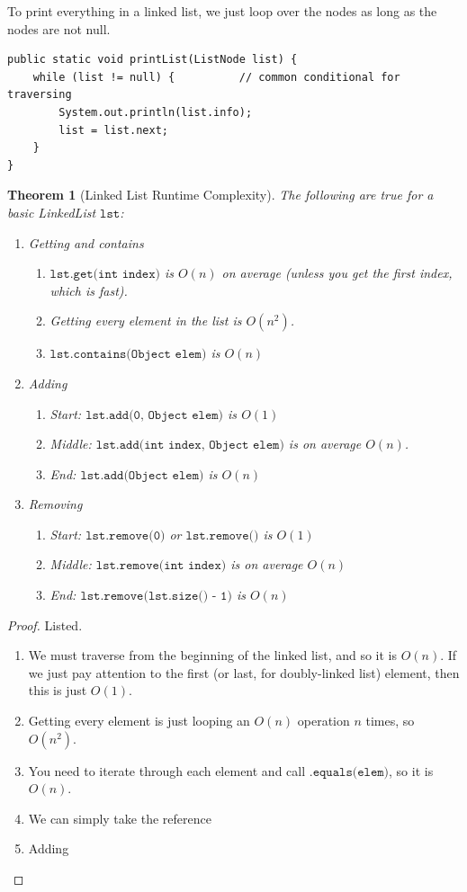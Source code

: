 \documentclass{article}
\newtheorem{theorem}{Theorem}[section]
\theoremstyle{definition}
\theoremstyle{remark}
\theoremstyle{definition}
\begin{document}
To print everything in a linked list, we just loop over the nodes as long as the nodes are not null. 
\begin{verbatim}
public static void printList(ListNode list) {
    while (list != null) {          // common conditional for traversing 
        System.out.println(list.info); 
        list = list.next; 
    }
}
\end{verbatim}

\begin{theorem}[Linked List Runtime Complexity]
The following are true for a basic LinkedList $\texttt{lst}$:  
\begin{enumerate}
    \item Getting and contains 
    \begin{enumerate}
        \item $\texttt{lst.get(int index)}$ is $O(n)$ on average (unless you get the first index, which is fast).  
        \item Getting every element in the list is $O(n^2)$. 
        \item $\texttt{lst.contains(Object elem)}$ is $O(n)$ 
    \end{enumerate}
    
    \item Adding 
    \begin{enumerate}
        \item Start:  $\texttt{lst.add(0, Object elem)}$ is $O(1)$ 
        \item Middle: $\texttt{lst.add(int index, Object elem)}$ is on average $O(n)$. 
        \item End:    $\texttt{lst.add(Object elem)}$ is $O(n)$
    \end{enumerate}
    
    \item Removing 
    \begin{enumerate}
        \item Start:  $\texttt{lst.remove(0)}$ or $\texttt{lst.remove()}$ is $O(1)$ 
        \item Middle: $\texttt{lst.remove(int index)}$ is on average $O(n)$ 
        \item End:    $\texttt{lst.remove(lst.size() - 1)}$ is $O(n)$ 
    \end{enumerate}
\end{enumerate}
\end{theorem}
\begin{proof}
Listed. 
\begin{enumerate}
    \item We must traverse from the beginning of the linked list, and so it is $O(n)$. If we just pay attention to the first (or last, for doubly-linked list) element, then this is just $O(1)$. 
    \item Getting every element is just looping an $O(n)$ operation $n$ times, so $O(n^2)$. 
    \item You need to iterate through each element and call $\texttt{.equals(elem)}$, so it is $O(n)$. 
    \item We can simply take the reference 
    \item Adding 
\end{enumerate}
\end{proof}
\end{document}
